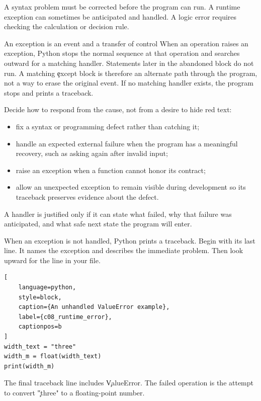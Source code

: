 A syntax problem must be corrected before the program can run. A runtime
exception can sometimes be anticipated and handled. A logic error requires
checking the calculation or decision rule.

\begin{ExplainBox}{An exception is an event and a transfer of control}
When an operation raises an exception, Python stops the normal sequence at
that operation and searches outward for a matching handler. Statements later
in the abandoned block do not run. A matching \c{except} block is therefore an
alternate path through the program, not a way to erase the original event.
If no matching handler exists, the program stops and prints a traceback.
\end{ExplainBox}

Decide how to respond from the cause, not from a desire to hide red text:
\begin{itemize}
    \item fix a syntax or programming defect rather than catching it;
    \item handle an expected external failure when the program has a meaningful
          recovery, such as asking again after invalid input;
    \item raise an exception when a function cannot honor its contract;
    \item allow an unexpected exception to remain visible during development
          so its traceback preserves evidence about the defect.
\end{itemize}

A handler is justified only if it can state what failed, why that failure was
anticipated, and what safe next state the program will enter.


When an exception is not handled, Python prints a traceback. Begin with its
last line. It names the exception and describes the immediate problem. Then
look upward for the line in your file.

\begin{lstlisting}[
    language=python,
    style=block,
    caption={An unhandled ValueError example},
    label={c08_runtime_error},
    captionpos=b
]
width_text = "three"
width_m = float(width_text)
print(width_m)
\end{lstlisting}

The final traceback line includes \c{ValueError}. The failed operation is the
attempt to convert \c{"three"} to a floating-point number.

